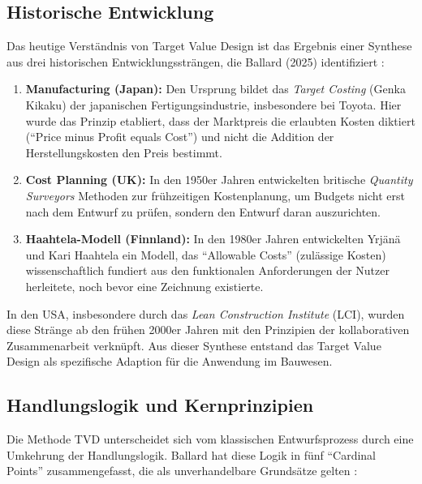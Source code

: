 \subsection{Historische Entwicklung}
\label{sec:2.3.2}

Das heutige Verständnis von Target Value Design ist das Ergebnis einer Synthese aus drei historischen Entwicklungssträngen, die Ballard (2025) identifiziert \autocite[Vgl.][Kap. 1]{ballard_target_2025}:

\begin{enumerate}
    \item \textbf{Manufacturing (Japan):} Den Ursprung bildet das \textit{Target Costing} (Genka Kikaku) der japanischen Fertigungsindustrie, insbesondere bei Toyota. Hier wurde das Prinzip etabliert, dass der Marktpreis die erlaubten Kosten diktiert (\enquote{Price minus Profit equals Cost}) und nicht die Addition der Herstellungskosten den Preis bestimmt.
    \item \textbf{Cost Planning (UK):} In den 1950er Jahren entwickelten britische \textit{Quantity Surveyors} Methoden zur frühzeitigen Kostenplanung, um Budgets nicht erst nach dem Entwurf zu prüfen, sondern den Entwurf daran auszurichten.
    \item \textbf{Haahtela-Modell (Finnland):} In den 1980er Jahren entwickelten Yrjänä und Kari Haahtela ein Modell, das \enquote{Allowable Costs} (zulässige Kosten) wissenschaftlich fundiert aus den funktionalen Anforderungen der Nutzer herleitete, noch bevor eine Zeichnung existierte.
\end{enumerate}

In den USA, insbesondere durch das \textit{Lean Construction Institute} (\acs{LCI}), wurden diese Stränge ab den frühen 2000er Jahren mit den Prinzipien der kollaborativen Zusammenarbeit verknüpft. Aus dieser Synthese entstand das Target Value Design als spezifische Adaption für die Anwendung im Bauwesen.

\subsection{Handlungslogik und Kernprinzipien}
\label{sec:2.3.3}

Die Methode \acs{TVD} unterscheidet sich vom klassischen Entwurfsprozess durch eine Umkehrung der Handlungslogik. Ballard hat diese Logik in fünf \enquote{Cardinal Points} zusammengefasst, die als unverhandelbare Grundsätze gelten \autocite[Vgl.][S.~15]{ballard_target_2012}:

